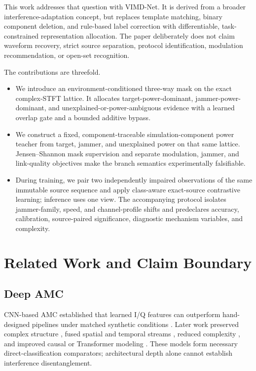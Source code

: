 \documentclass[letterpaper,journal]{IEEEtran}
\newcommand{\method}{VIMD-Net}
\begin{document}
This work addresses that question with \method.  It is derived from a broader
interference-adaptation concept, but replaces template matching, binary
component deletion, and rule-based label correction with differentiable,
task-constrained representation allocation.  The paper deliberately does not
claim waveform recovery, strict source separation, protocol identification,
modulation recommendation, or open-set recognition.

The contributions are threefold.
\begin{itemize}
  \item We introduce an environment-conditioned three-way mask on the exact
  complex-STFT lattice.  It allocates target-power-dominant,
  jammer-power-dominant, and unexplained-or-power-ambiguous evidence with a
  learned overlap gate and a bounded additive bypass.
  \item We construct a fixed, component-traceable simulation-component power
  teacher from target, jammer, and unexplained power on that same lattice.
  Jensen--Shannon mask
  supervision and separate modulation, jammer, and link-quality objectives
  make the branch semantics experimentally falsifiable.
  \item During training, we pair two independently impaired observations of
  the same immutable source sequence and apply class-aware exact-source
  contrastive learning; inference uses one view.  The accompanying protocol
  isolates jammer-family, speed, and channel-profile shifts and predeclares
  accuracy, calibration, source-paired significance, diagnostic mechanism
  variables, and complexity.
\end{itemize}

\section{Related Work and Claim Boundary}
\subsection{Deep AMC}
CNN-based AMC established that learned I/Q features can outperform
hand-designed pipelines under matched synthetic conditions
\cite{oshea2016cnn,oshea2017physical,meng2018amc}.  Later work preserved
complex structure \cite{tu2020complex}, fused spatial and temporal streams
\cite{zhang2020dual}, reduced complexity \cite{wang2020lightamc}, and improved
causal or Transformer modeling \cite{tang2024repccnet,cai2022transformer,
shao2025iqformer}.  These models form necessary direct-classification
comparators; architectural depth alone cannot establish interference
disentanglement.
\end{document}
